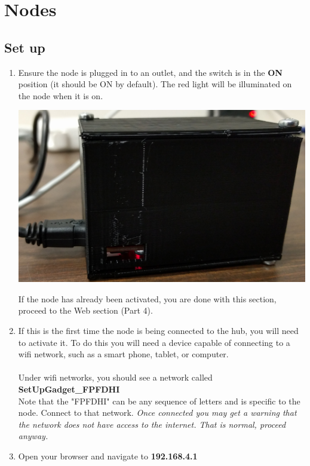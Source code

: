   \section{Nodes}
  \subsection{Set up}
    \begin{enumerate}
      \item Ensure the node is plugged in to an outlet, and the switch is in the \textbf{ON} position 
      (it should be ON by default).
      The red light will be illuminated on the node when it is on.
      \begin{center}
      \includegraphics[scale=.1]{images/nodes.png}
    \end{center}

      If the node has already been activated, you are done with this section, proceed to the Web section (Part 4).

      \item If this is the first time the node is being connected to the hub,
      you will need to activate it. To do this you will need a device
      capable of connecting to a wifi network, such as a smart phone, tablet, or computer.\\
      \\ 
      Under wifi networks, you should see a network called \textbf{SetUpGadget\_FPFDHI}\\
      Note that the "FPFDHI" can be any sequence of letters and is specific to the node. Connect to that network. 
      \emph{Once connected you may get a warning that the network does not have access
      to the internet. That is normal, proceed anyway.}

      \item Open your browser and navigate to \textbf{192.168.4.1}


\end{enumerate}
